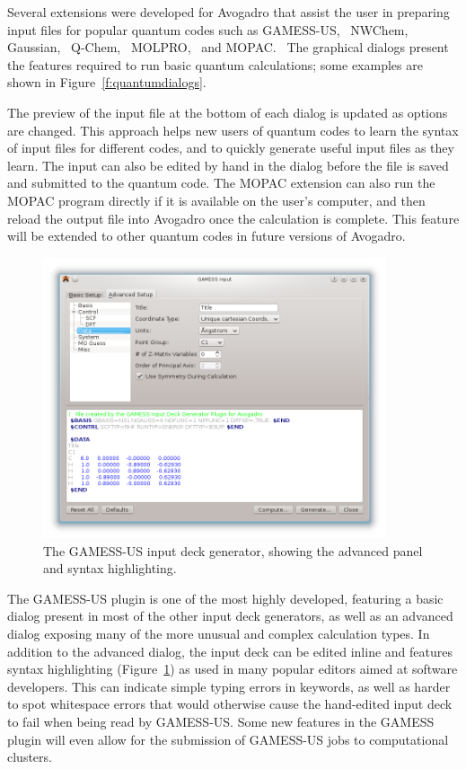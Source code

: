 \documentclass[10pt]{bmc_article}
\newenvironment{bmcformat}{\begin{raggedright}
\baselineskip20pt\sloppy\setboolean{publ}{false}}{\end{raggedright}
\baselineskip20pt\sloppy}
\begin{document}
\begin{bmcformat}
Several extensions were developed for Avogadro that assist the user in preparing
input files for popular quantum codes such as
GAMESS-US,~\cite{GAMESS-US} NWChem,~\cite{NWChem}
Gaussian,~\cite{Gaussian} Q-Chem,~\cite{Q-Chem3} MOLPRO,~\cite{MOLPRO}
and MOPAC.~\cite{MOPAC} The graphical dialogs present the features
required to run basic quantum calculations; some examples are shown in
Figure~\ref{f:quantumdialogs}.

The preview of the input file at the bottom of each dialog is updated as options
are changed. This approach helps new users of quantum codes to learn the syntax
of input files for different codes, and to quickly generate useful input files
as they learn. The input can also be edited by hand in the dialog before the file is saved
and submitted to the quantum code. The MOPAC extension can also run the MOPAC
program directly if it is available on the user's computer, and then reload the
output file into Avogadro once the calculation is complete. This
feature will be extended to other quantum codes in future versions of Avogadro.

\begin{figure}
  \begin{center}
    \includegraphics[width=0.9\textwidth]{images/gamess-input}
  \end{center}
  \caption{The GAMESS-US input deck generator, showing the advanced panel and syntax highlighting.}
  \label{f:gamess}
\end{figure}

The GAMESS-US plugin is one of the most highly developed, featuring a basic dialog
present in most of the other input deck generators, as well as an advanced dialog
exposing many of the more unusual and complex calculation types. In addition to
the advanced dialog, the input deck can be edited inline and features syntax
highlighting (Figure~\ref{f:gamess}) as used in many popular editors aimed at software developers. This
can indicate simple typing errors in keywords, as well as harder to spot whitespace
errors that would otherwise cause the hand-edited input deck to fail when being
read by GAMESS-US. Some new features in the GAMESS plugin will even allow
for the submission of GAMESS-US jobs to computational clusters.


\end{bmcformat}
\end{document}
